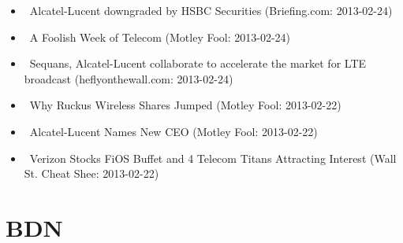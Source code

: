 \documentclass[11pt,asymmetric]{article}
\begin{document}
\begin{itemize}
\item\ Alcatel-Lucent downgraded by HSBC Securities (Briefing.com: 2013-02-24)
\item\ A Foolish Week of Telecom (Motley Fool: 2013-02-24)
\item\ Sequans, Alcatel-Lucent collaborate to accelerate the market for LTE broadcast (heflyonthewall.com: 2013-02-24)
\item\ Why Ruckus Wireless Shares Jumped (Motley Fool: 2013-02-22)
\item\ Alcatel-Lucent Names New CEO (Motley Fool: 2013-02-22)
\item\ Verizon Stocks FiOS Buffet and 4 Telecom Titans Attracting Interest (Wall St. Cheat Shee: 2013-02-22)
\end{itemize}

\section*{BDN}
\end{document}

